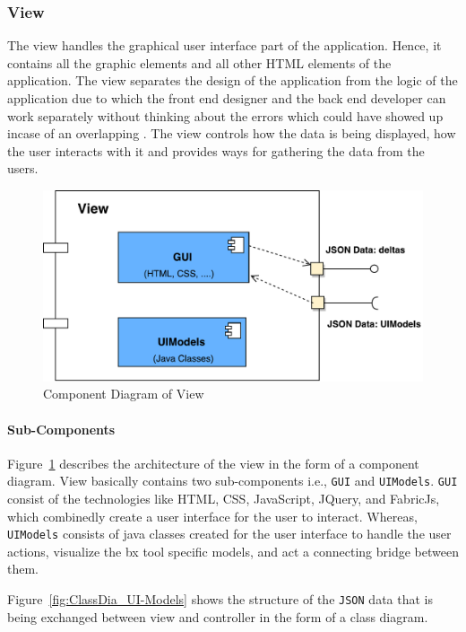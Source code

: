 \subsubsection{View}\label{subsubsec:design_view}
The view handles the graphical user interface part of the application. Hence, it contains all the graphic elements and all other HTML elements of the application. The view separates the design of the application from the logic of the application due to which the front end designer and the back end developer can work separately without thinking about the errors which could have showed up incase of an overlapping \cite{designpattern-headfirst} \cite{mvc-arch}. The view controls how the data is being displayed, how the user interacts with it and provides ways for gathering the data from the users.

\begin{figure}
	\includegraphics[width=1\textwidth]{figures/Component_Diagram-View}
	\caption{Component Diagram of View}
	\label{fig:Component_Diagram-View}
\end{figure}

\paragraph{Sub-Components}
Figure~\ref{fig:Component_Diagram-View} describes the architecture of the view in the form of a component diagram. View basically contains two sub-components i.e., \texttt{GUI} and \texttt{UIModels}. \texttt{GUI} consist of the technologies like HTML, CSS, JavaScript, JQuery, and FabricJs, which combinedly create a user interface for the user to interact. Whereas, \texttt{UIModels} consists of java classes created for the user interface to handle the user actions, visualize the bx tool specific models, and act a connecting bridge between them. 

Figure~\ref{fig:ClassDia_UI-Models} shows the structure of the \texttt{JSON} data that is being exchanged between view and controller in the form of a class diagram.

